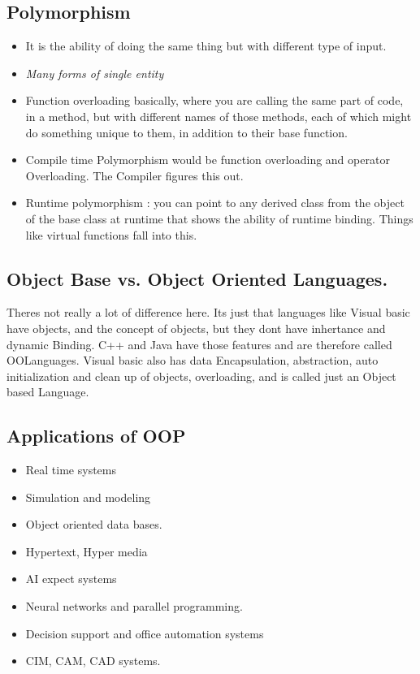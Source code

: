 \documentclass[11pt]{article}
\begin{document}
\subsection{Polymorphism}
\begin{itemize}
	\item It is the ability of doing the same thing but with different type of input. 
	\item \textit{Many forms of single entity}
	\item Function overloading basically, where you are calling the same part of code, in a method, but with different names of those methods, each of which might do something unique to them, in addition to their base function. 
	\item Compile time Polymorphism would be function overloading and operator Overloading. The Compiler figures this out. 
	\item Runtime polymorphism : you can point to any derived class from the object of the base class at runtime that shows the ability of runtime binding. Things like virtual functions fall into this. 
\end{itemize}

\subsection{Object Base vs. Object Oriented Languages. }
Theres not really a lot of difference here. Its just that languages like Visual basic have objects, and the concept of objects, but they dont have inhertance and dynamic Binding. C++ and Java have those features and are therefore called OOLanguages. Visual basic also has data Encapsulation, abstraction, auto initialization and clean up of objects, overloading, and is called just an Object based Language.


\subsection{Applications of OOP}
\begin{itemize}
	\item Real time systems
	\item Simulation and modeling
	\item Object oriented data bases. 
	\item Hypertext, Hyper media
	\item AI expect systems
	\item Neural networks and parallel programming. 
	\item Decision support and office automation systems
	\item CIM, CAM, CAD systems. 
\end{itemize}
\end{document}
